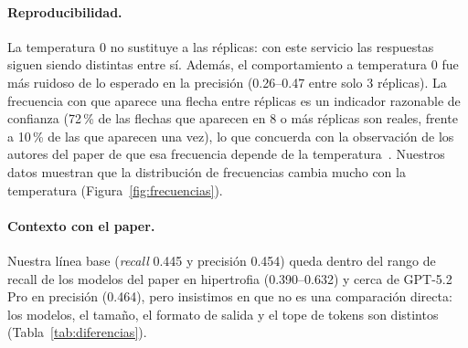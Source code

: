 \documentclass[unnumsec,webpdf,contemporary,large]{oup-authoring-template}
\begin{document}
\paragraph{Reproducibilidad.} La temperatura 0 no sustituye a las réplicas: con este servicio las respuestas siguen siendo distintas entre sí. Además, el comportamiento a temperatura 0 fue más ruidoso de lo esperado en la precisión (0.26--0.47 entre solo 3 réplicas). La frecuencia con que aparece una flecha entre réplicas es un indicador razonable de confianza (72\,\% de las flechas que aparecen en 8 o más réplicas son reales, frente a 10\,\% de las que aparecen una vez), lo que concuerda con la observación de los autores del paper de que esa frecuencia depende de la temperatura~\cite{tewari2026}. Nuestros datos muestran que la distribución de frecuencias cambia mucho con la temperatura (Figura~\ref{fig:frecuencias}).

\paragraph{Contexto con el paper.} Nuestra línea base (\emph{recall} 0.445 y precisión 0.454) queda dentro del rango de recall de los modelos del paper en hipertrofia (0.390--0.632) y cerca de GPT-5.2 Pro en precisión (0.464), pero insistimos en que no es una comparación directa: los modelos, el tamaño, el formato de salida y el tope de tokens son distintos (Tabla~\ref{tab:diferencias}).
\end{document}
